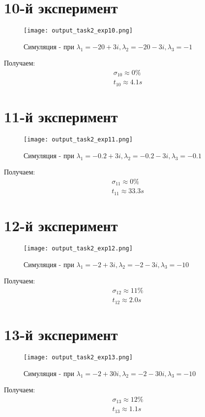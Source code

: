 \newpage
\section{10-й эксперимент}
\begin{figure}[ht]
    \centering
    \texttt{[image: output\_task2\_exp10.png]}
  \caption{Симуляция - при $\lambda_1 = -20 +3i, \lambda_2 = -20 - 3i,\lambda_3 = -1$}
\end{figure}
Получаем:
$$
\begin{aligned}
  \sigma_{10} \approx 0\% \\
  t_{10} \approx 4.1s
\end{aligned}
$$

\newpage
\section{11-й эксперимент}
\begin{figure}[ht]
    \centering
    \texttt{[image: output\_task2\_exp11.png]}
  \caption{Симуляция - при $\lambda_1 = -0.2 +3i, \lambda_2 = -0.2 - 3i,\lambda_3 = -0.1$}
\end{figure}
Получаем:
$$
\begin{aligned}
  \sigma_{11} \approx 0\% \\
  t_{11} \approx 33.3s
\end{aligned}
$$

\newpage
\section{12-й эксперимент}
\begin{figure}[ht]
    \centering
    \texttt{[image: output\_task2\_exp12.png]}
  \caption{Симуляция - при $\lambda_1 = -2 +3i, \lambda_2 = -2 - 3i,\lambda_3 = -10$}
\end{figure}
Получаем:
$$
\begin{aligned}
  \sigma_{12} \approx 11\% \\
  t_{12} \approx 2.0s
\end{aligned}
$$

\newpage
\section{13-й эксперимент}
\begin{figure}[ht]
    \centering
    \texttt{[image: output\_task2\_exp13.png]}
  \caption{Симуляция - при $\lambda_1 = -2 +30i, \lambda_2 = -2 - 30i,\lambda_3 = -10$}
\end{figure}
Получаем:
$$
\begin{aligned}
  \sigma_{13} \approx 12\% \\
  t_{13} \approx 1.1s
\end{aligned}
$$

